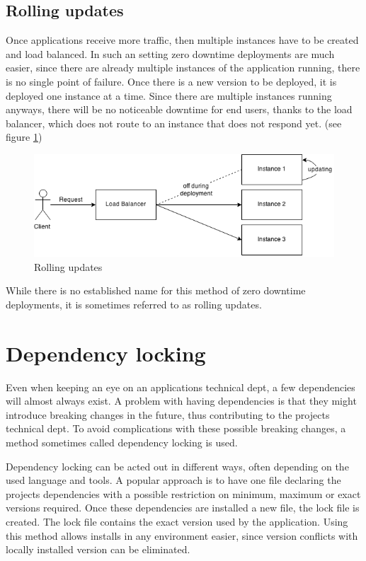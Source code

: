 \cite{cd}

\subsection{Rolling updates}

Once applications receive more traffic, then multiple instances have to be
created and load balanced. In such an setting zero downtime deployments are
much easier, since there are already multiple instances of the application
running, there is no single point of failure. Once there is a new version to be
deployed, it is deployed one instance at a time. Since there are multiple
instances running anyways, there will be no noticeable downtime for end users,
thanks to the load balancer, which does not route to an instance that does not
respond yet. (see figure \ref{fig:rolling_updates})

\begin{figure}
  \includegraphics[scale=0.55]{pictures/rolling_updates.png}
  \caption{Rolling updates}
  \centering
  \label{fig:rolling_updates}
\end{figure}

While there is no established name for this method of zero downtime
deployments, it is sometimes referred to as rolling updates.

\section{Dependency locking}

Even when keeping an eye on an applications technical dept, a few dependencies
will almost always exist. A problem with having dependencies is that they might
introduce breaking changes in the future, thus contributing to the projects
technical dept. To avoid complications with these possible breaking changes, a
method sometimes called dependency locking is used.

Dependency locking can be acted out in different ways, often depending on the
used language and tools. A popular approach is to have one file declaring the
projects dependencies with a possible restriction on minimum, maximum or exact
versions required. Once these dependencies are installed a new file, the lock
file is created. The lock file contains the exact version used by the
application. Using this method allows installs in any environment easier, since
version conflicts with locally installed version can be eliminated.

